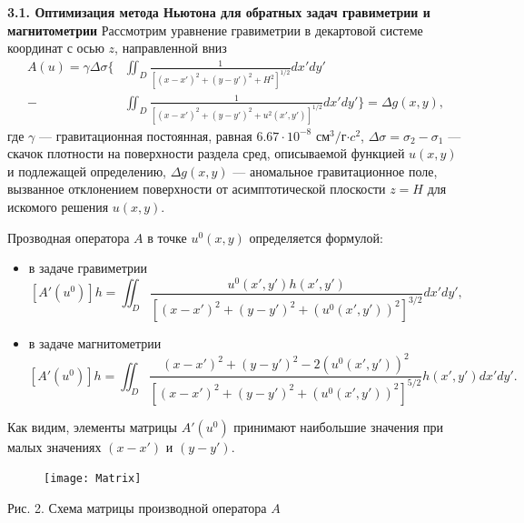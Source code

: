 \documentclass[10pt,pdf, mathserif, hyperref={unicode}]{beamer}
\begin{document}
\begin{frame}{\small\textbf{3.1. Оптимизация метода Ньютона для обратных задач гравиметрии и магнитометрии}}
	Рассмотрим уравнение гравиметрии в декартовой системе координат с осью $z$, направленной вниз 
	\begin{equation*}
	\begin{aligned}
	A(u)=\gamma\Delta\sigma \bigg\{ &\iint_{D} \frac{1}{[(x-x')^2+(y-y')^2+H^2]^{1/2}}dx'dy' \\
	- &\iint_{D} \frac{1}{[(x-x')^2+(y-y')^2+u^2(x',y')]^{1/2}}dx'dy'\bigg\}=\Delta g(x,y),
	\end{aligned} 
	\end{equation*}
	где $\gamma$ --- гравитационная постоянная, равная $6.67\cdot10^{-8}$ см$^3/$г$\cdot c^2$, $\Delta\sigma=\sigma_2-\sigma_1$ --- скачок плотности на поверхности раздела сред, описываемой функцией $u(x,y)$ и подлежащей определению, $\Delta g(x,y)$ --- аномальное гравитационное поле, вызванное отклонением поверхности от асимптотической плоскости $z=H$ для искомого решения $u(x,y)$.
\end{frame}
\begin{frame}
	Прозводная оператора $A$ в точке $u^0(x,y)$ определяется формулой:
	\begin{itemize}
		\item в задаче гравиметрии
		$$ [A'(u^0)]h=\iint_{D} \frac{u^0(x',y')h(x',y')}{[(x-x')^2+(y-y')^2+(u^0(x',y'))^2]^{3/2}}dx'dy',$$
		\item в задаче магнитометрии
		$$ [A'(u^0)]h=\iint_{D} \frac{(x-x')^2+(y-y')^2-2(u^0(x',y'))^2}{[(x-x')^2+(y-y')^2+(u^0(x',y'))^2]^{5/2}}h(x',y')dx'dy'.$$
	\end{itemize}
	Как видим, элементы матрицы $A'(u^0)$ принимают наибольшие значения при малых значениях $(x-x')$ и $(y-y')$.
	\begin{figure}
		\texttt{[image: Matrix]}
	\end{figure}
	\centering Рис. 2. Схема матрицы производной оператора $A$
\end{frame}
\end{document}
